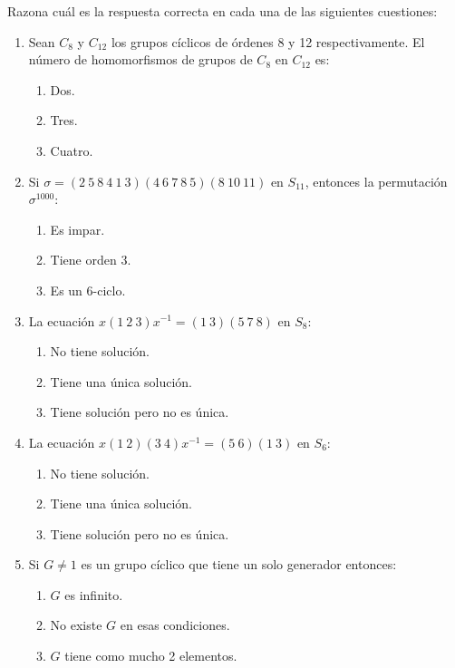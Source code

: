 \documentclass[12pt]{article}
\begin{document}
    \begin{ejercicio}
        Razona cuál es la respuesta correcta en cada una de las siguientes cuestiones:
        \begin{enumerate}
            \item Sean $C_8$ y $C_{12}$ los grupos cíclicos de órdenes 8 y 12 respectivamente. El número de homomorfismos de grupos de $C_8$ en $C_{12}$ es:
            \begin{enumerate}
                \item Dos.
                \item Tres.
                \item Cuatro.
            \end{enumerate}

            \item Si $\sigma = (2\ 5\ 8\ 4\ 1\ 3)(4\ 6\ 7\ 8\ 5)(8\ 10\ 11)$ en $S_{11}$, entonces la permutación $\sigma^{1000}$:
            \begin{enumerate}
                \item Es impar.
                \item Tiene orden 3.
                \item Es un 6-ciclo.
            \end{enumerate}

            \item La ecuación $x(1\ 2\ 3)x^{-1} = (1\ 3)(5\ 7\ 8)$ en $S_8$:
            \begin{enumerate}
                \item No tiene solución.
                \item Tiene una única solución.
                \item Tiene solución pero no es única.
            \end{enumerate}


            \item La ecuación $x(1\ 2)(3\ 4)x^{-1} = (5\ 6)(1\ 3)$ en $S_6$:
            \begin{enumerate}
                \item No tiene solución.
                \item Tiene una única solución.
                \item Tiene solución pero no es única.
            \end{enumerate}

            \item Si $G \neq 1$ es un grupo cíclico que tiene un solo generador entonces:
            \begin{enumerate}
                \item $G$ es infinito.
                \item No existe $G$ en esas condiciones.
                \item $G$ tiene como mucho 2 elementos.
            \end{enumerate}


\end{enumerate}
\end{ejercicio}
\end{document}
